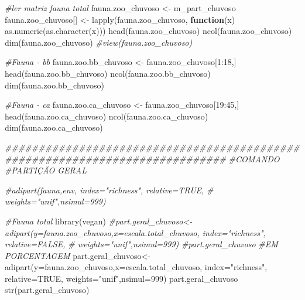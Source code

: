 \documentclass[
  letterpaper,
  DIV=11,
  numbers=noendperiod]{scrartcl}
\newenvironment{Shaded}{}{}
\newcommand{\AttributeTok}[1]{\textcolor[rgb]{0.49,0.56,0.16}{#1}}
\newcommand{\CommentTok}[1]{\textcolor[rgb]{0.38,0.63,0.69}{\textit{#1}}}
\newcommand{\ConstantTok}[1]{\textcolor[rgb]{0.53,0.00,0.00}{#1}}
\newcommand{\ControlFlowTok}[1]{\textcolor[rgb]{0.00,0.44,0.13}{\textbf{#1}}}
\newcommand{\DecValTok}[1]{\textcolor[rgb]{0.25,0.63,0.44}{#1}}
\newcommand{\DocumentationTok}[1]{\textcolor[rgb]{0.73,0.13,0.13}{\textit{#1}}}
\newcommand{\FunctionTok}[1]{\textcolor[rgb]{0.02,0.16,0.49}{#1}}
\newcommand{\NormalTok}[1]{#1}
\newcommand{\OtherTok}[1]{\textcolor[rgb]{0.00,0.44,0.13}{#1}}
\newcommand{\SpecialCharTok}[1]{\textcolor[rgb]{0.25,0.44,0.63}{#1}}
\newcommand{\StringTok}[1]{\textcolor[rgb]{0.25,0.44,0.63}{#1}}
\begin{document}
\begin{Shaded}
\begin{Highlighting}[numbers=left,,]
\CommentTok{\#ler matriz fauna total}
\NormalTok{fauna.zoo\_chuvoso }\OtherTok{\textless{}{-}}\NormalTok{ m\_part\_chuvoso}
\NormalTok{fauna.zoo\_chuvoso[] }\OtherTok{\textless{}{-}} \FunctionTok{lapply}\NormalTok{(fauna.zoo\_chuvoso, }\ControlFlowTok{function}\NormalTok{(x) }\FunctionTok{as.numeric}\NormalTok{(}\FunctionTok{as.character}\NormalTok{(x)))}
\FunctionTok{head}\NormalTok{(fauna.zoo\_chuvoso)}
\FunctionTok{ncol}\NormalTok{(fauna.zoo\_chuvoso)}
\FunctionTok{dim}\NormalTok{(fauna.zoo\_chuvoso)}
\CommentTok{\#view(fauna.zoo\_chuvoso)}

\CommentTok{\#Fauna {-} bb}
\NormalTok{fauna.zoo.bb\_chuvoso }\OtherTok{\textless{}{-}}\NormalTok{ fauna.zoo\_chuvoso[}\DecValTok{1}\SpecialCharTok{:}\DecValTok{18}\NormalTok{,]}
\FunctionTok{head}\NormalTok{(fauna.zoo.bb\_chuvoso)}
\FunctionTok{ncol}\NormalTok{(fauna.zoo.bb\_chuvoso)}
\FunctionTok{dim}\NormalTok{(fauna.zoo.bb\_chuvoso)}

\CommentTok{\#Fauna {-} ca}
\NormalTok{fauna.zoo.ca\_chuvoso }\OtherTok{\textless{}{-}}\NormalTok{ fauna.zoo\_chuvoso[}\DecValTok{19}\SpecialCharTok{:}\DecValTok{45}\NormalTok{,]}
\FunctionTok{head}\NormalTok{(fauna.zoo.ca\_chuvoso)}
\FunctionTok{ncol}\NormalTok{(fauna.zoo.ca\_chuvoso)}
\FunctionTok{dim}\NormalTok{(fauna.zoo.ca\_chuvoso)}

\DocumentationTok{\#\#\#\#\#\#\#\#\#\#\#\#\#\#\#\#\#\#\#\#\#\#\#\#\#\#\#\#\#\#\#\#\#\#\#\#\#\#\#\#\#\#\#\#\#\#\#\#\#\#\#\#\#\#\#\#\#\#\#\#\#\#\#\#\#\#\#\#\#\#\#\#\#\#\#\#\#}
\CommentTok{\#COMANDO}
\CommentTok{\#PARTIÇÃO GERAL}

\CommentTok{\#adipart(fauna,env, index="richness", relative=TRUE,}
\CommentTok{\#        weights="unif",nsimul=999)}

\CommentTok{\#Fauna total}
\FunctionTok{library}\NormalTok{(vegan)}
\CommentTok{\#part.geral\_chuvoso\textless{}{-}adipart(y=fauna.zoo\_chuvoso,x=escala.total\_chuvoso, index="richness", relative=FALSE,}
\CommentTok{\#                    weights="unif",nsimul=999)}
\CommentTok{\#part.geral\_chuvoso}
\CommentTok{\#EM PORCENTAGEM}
\NormalTok{part.geral\_chuvoso}\OtherTok{\textless{}{-}}\FunctionTok{adipart}\NormalTok{(}\AttributeTok{y=}\NormalTok{fauna.zoo\_chuvoso,}\AttributeTok{x=}\NormalTok{escala.total\_chuvoso, }\AttributeTok{index=}\StringTok{"richness"}\NormalTok{, }\AttributeTok{relative=}\ConstantTok{TRUE}\NormalTok{,}
                         \AttributeTok{weights=}\StringTok{"unif"}\NormalTok{,}\AttributeTok{nsimul=}\DecValTok{999}\NormalTok{)}
\NormalTok{part.geral\_chuvoso}
\FunctionTok{str}\NormalTok{(part.geral\_chuvoso)}


\end{Highlighting}
\end{Shaded}
\end{document}
